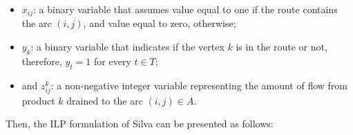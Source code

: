\documentclass{ro}
\begin{document}
\begin{itemize}
	\item $x_{ij}$: a binary variable that assumes
	value equal to one if the route contains the arc $(i,j)$, and value equal to zero, otherwise; 
	\item $y_k$: a binary variable that indicates if the vertex $k$ is in the route or not, therefore, $y_t=1$ for every $t \in T$;
	\item and $z_{ij}^k$: a non-negative integer variable representing the amount of flow from product $k$ drained to the arc $(i,j) \in A$.
\end{itemize}

Then, the ILP formulation of Silva \cite{silva2009problema} can be presented as follows:

\end{document}
